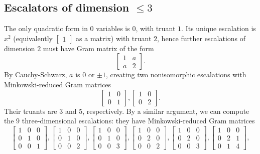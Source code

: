 \documentclass{article}
\begin{document}
\subsection{Escalators of dimension $\le 3$}
The only quadratic form in $0$ variables is $0$, with truant $1$. Its unique escalation is $x^2$ (equivalently $\begin{bmatrix} 1 \end{bmatrix}$ as a matrix) with truant $2$, hence further escalations of dimension $2$ must have Gram matrix of the form
\[\begin{bmatrix} 1 & a \\ a & 2 \end{bmatrix}.\]
By Cauchy-Schwarz, $a$ is $0$ or $\pm 1$, creating two nonisomorphic escalations with Minkowski-reduced Gram matrices
\[\begin{bmatrix} 1 & 0 \\ 0 & 1 \end{bmatrix}, \begin{bmatrix} 1 & 0 \\ 0 & 2 \end{bmatrix}.\]
Their truants are $3$ and $5$, respectively. By a similar argument, we can compute the $9$ three-dimensional escalations: they have Minkowski-reduced Gram matrices
\[\begin{bmatrix} 1 & 0 & 0 \\ 0 & 1 & 0 \\ 0 & 0 & 1 \end{bmatrix}, \begin{bmatrix} 1 & 0 & 0 \\ 0 & 1 & 0 \\ 0 & 0 & 2 \end{bmatrix}, \begin{bmatrix} 1 & 0 & 0 \\ 0 & 1 & 0 \\ 0 & 0 & 3 \end{bmatrix}, \begin{bmatrix} 1 & 0 & 0 \\ 0 & 2 & 0 \\ 0 & 0 & 2 \end{bmatrix}, \begin{bmatrix} 1 & 0 & 0 \\ 0 & 2 & 0 \\ 0 & 0 & 3 \end{bmatrix}, \begin{bmatrix} 1 & 0 & 0 \\ 0 & 2 & 1 \\ 0 & 1 & 4 \end{bmatrix},\]
\end{document}
